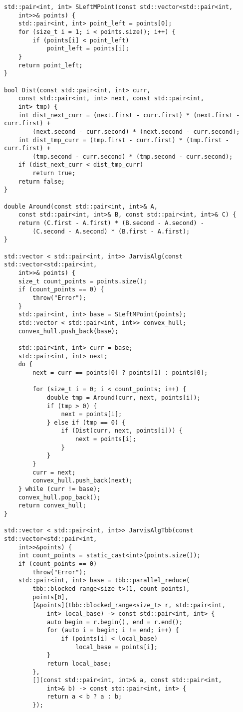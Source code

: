\documentclass{report}
\begin{document}
\begin{lstlisting}
std::pair<int, int> SLeftMPoint(const std::vector<std::pair<int,
    int>>& points) {
    std::pair<int, int> point_left = points[0];
    for (size_t i = 1; i < points.size(); i++) {
        if (points[i] < point_left)
            point_left = points[i];
    }
    return point_left;
}

bool Dist(const std::pair<int, int> curr,
    const std::pair<int, int> next, const std::pair<int,
    int> tmp) {
    int dist_next_curr = (next.first - curr.first) * (next.first - curr.first) +
        (next.second - curr.second) * (next.second - curr.second);
    int dist_tmp_curr = (tmp.first - curr.first) * (tmp.first - curr.first) +
        (tmp.second - curr.second) * (tmp.second - curr.second);
    if (dist_next_curr < dist_tmp_curr)
        return true;
    return false;
}

double Around(const std::pair<int, int>& A,
    const std::pair<int, int>& B, const std::pair<int, int>& C) {
    return (C.first - A.first) * (B.second - A.second) -
        (C.second - A.second) * (B.first - A.first);
}

std::vector < std::pair<int, int>> JarvisAlg(const std::vector<std::pair<int,
    int>>& points) {
    size_t count_points = points.size();
    if (count_points == 0) {
        throw("Error");
    }
    std::pair<int, int> base = SLeftMPoint(points);
    std::vector < std::pair<int, int>> convex_hull;
    convex_hull.push_back(base);

    std::pair<int, int> curr = base;
    std::pair<int, int> next;
    do {
        next = curr == points[0] ? points[1] : points[0];

        for (size_t i = 0; i < count_points; i++) {
            double tmp = Around(curr, next, points[i]);
            if (tmp > 0) {
                next = points[i];
            } else if (tmp == 0) {
                if (Dist(curr, next, points[i])) {
                    next = points[i];
                }
            }
        }
        curr = next;
        convex_hull.push_back(next);
    } while (curr != base);
    convex_hull.pop_back();
    return convex_hull;
}

std::vector < std::pair<int, int>> JarvisAlgTbb(const std::vector<std::pair<int,
    int>>&points) {
    int count_points = static_cast<int>(points.size());
    if (count_points == 0)
        throw("Error");
    std::pair<int, int> base = tbb::parallel_reduce(
        tbb::blocked_range<size_t>(1, count_points),
        points[0],
        [&points](tbb::blocked_range<size_t> r, std::pair<int,
            int> local_base) -> const std::pair<int, int> {
            auto begin = r.begin(), end = r.end();
            for (auto i = begin; i != end; i++) {
                if (points[i] < local_base)
                    local_base = points[i];
            }
            return local_base;
        },
        [](const std::pair<int, int>& a, const std::pair<int,
            int>& b) -> const std::pair<int, int> {
            return a < b ? a : b;
        });


\end{lstlisting}
\end{document}
